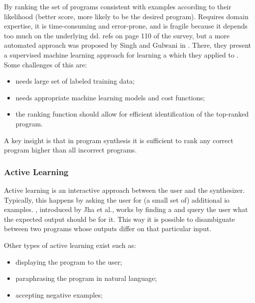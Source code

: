  By ranking the set of programs
consistent with examples according to their likelihood (better score, more
likely to be the desired program). Requires domain expertise, it is
time-consuming and error-prone, and is fragile because it depends too much on
the underlying \gls{dsl}.  {refs on page 110 of the survey},
but a more automated approach was proposed by Singh and Gulwani in
\cite{Singh:ranking:2015}. There, they present a supervised machine learning
approach for learning a  which
they applied to . Some challenges of this are:
\begin{itemize}
\item needs large set of labeled training data;
\item needs appropriate machine learning models and cost functions;
\item the ranking function should allow for efficient identification of the
  top-ranked program.
\end{itemize}

 A key insight is that in program synthesis it
is sufficient to rank any correct program higher than all incorrect programs.

\subsubsection{Active Learning}

Active learning is an interactive approach between the user and the synthesizer.
Typically, this happens by asking the user for (a small set of) additional
\gls{io} examples. ,
introduced by Jha et al.\cite{Jha:oracle:2010}, works by finding a
and query the user what the expected output should be for it. This way it is
possible to disambiguate between two programs whose outputs differ on that
particular input.

Other types of active learning exist such as:
\begin{itemize}
\item displaying the program to the user;
\item paraphrasing the program in natural language;
\item accepting negative examples; 
\end{itemize}


